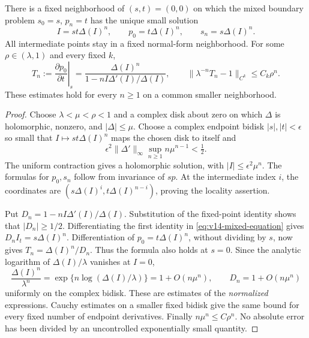 \begin{lemma}
\label{lem:v14-mixed-normal-form}
There is a fixed neighborhood of $(s,t)=(0,0)$ on which the mixed
boundary problem $s_0=s$, $p_n=t$ has the unique small solution
\begin{equation}\label{eq:v14-mixed-equation}
 I=st\Delta(I)^n,\qquad
 p_0=t\Delta(I)^n,\qquad s_n=s\Delta(I)^n.
\end{equation}
All intermediate points stay in a fixed normal-form neighborhood. For
some $\rho\in(\lambda,1)$ and every fixed $k$,
\begin{equation}\label{eq:v14-twist-normal-form}
 T_n:=\left.\frac{\partial p_0}{\partial t}\right|_s
 =\frac{\Delta(I)^n}{1-nI\Delta'(I)/\Delta(I)},
 \qquad
 \|\lambda^{-n}T_n-1\|_{C^k}\le C_k\rho^n.
\end{equation}
These estimates hold for every $n\ge1$ on a common smaller neighborhood.
\end{lemma}
\begin{proof}
Choose $\lambda<\mu<\rho<1$ and a complex disk about zero on which
$\Delta$ is holomorphic, nonzero, and $|\Delta|\le\mu$.
Choose a complex endpoint bidisk $|s|,|t|<\epsilon$ so small that
$I\mapsto st\Delta(I)^n$ maps the chosen disk to itself and
\[
 \epsilon^2\|\Delta'\|_\infty
                   \sup_{n\ge1}n\mu^{n-1}<\tfrac12.
\]
The uniform contraction gives a holomorphic solution, with
$|I|\le\epsilon^2\mu^n$. The formulas for $p_0,s_n$ follow from
invariance of $sp$. At the intermediate index $i$, the coordinates are
$(s\Delta(I)^i,t\Delta(I)^{n-i})$, proving the locality assertion.

Put $D_n=1-nI\Delta'(I)/\Delta(I)$. Substitution of the fixed-point
identity shows that $|D_n|\ge1/2$. Differentiating the first identity in
\eqref{eq:v14-mixed-equation} gives $D_n I_t=s\Delta(I)^n$.
Differentiation of $p_0=t\Delta(I)^n$, without dividing by $s$, now
gives $T_n=\Delta(I)^n/D_n$. Thus the formula also holds at $s=0$.
Since the analytic logarithm of $\Delta(I)/\lambda$ vanishes at $I=0$,
\[
 \frac{\Delta(I)^n}{\lambda^n}
   =\exp\{n\log(\Delta(I)/\lambda)\}
   =1+O(n\mu^n),\qquad D_n=1+O(n\mu^n)
\]
uniformly on the complex bidisk. These are estimates of the
\emph{normalized} expressions. Cauchy estimates on a smaller fixed
bidisk give the same bound for every fixed number of endpoint
derivatives. Finally $n\mu^n\le C\rho^n$. No absolute error has
been divided by an uncontrolled exponentially small quantity.
\end{proof}

